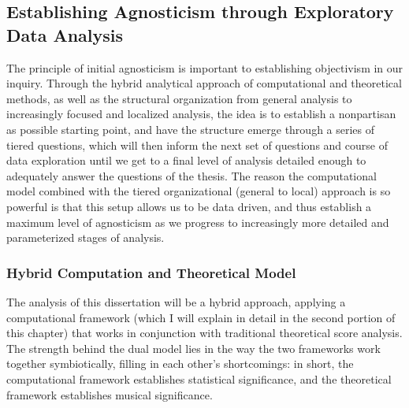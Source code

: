     \subsection{Establishing Agnosticism through Exploratory Data
Analysis}\label{establishing-agnosticism-through-exploratory-data-analysis}

The principle of initial agnosticism is important to establishing
objectivism in our inquiry. Through the hybrid analytical approach of
computational and theoretical methods, as well as the structural
organization from general analysis to increasingly focused and localized
analysis, the idea is to establish a nonpartisan as possible starting
point, and have the structure emerge through a series of tiered
questions, which will then inform the next set of questions and course
of data exploration until we get to a final level of analysis detailed
enough to adequately answer the questions of the thesis. The reason the
computational model combined with the tiered organizational (general to
local) approach is so powerful is that this setup allows us to be data
driven, and thus establish a maximum level of agnosticism as we progress
to increasingly more detailed and parameterized stages of analysis.

\subsubsection{Hybrid Computation and Theoretical
Model}\label{hybrid-computation-and-theoretical-model}

The analysis of this dissertation will be a hybrid approach, applying a
computational framework (which I will explain in detail in the second
portion of this chapter) that works in conjunction with traditional
theoretical score analysis. The strength behind the dual model lies in
the way the two frameworks work together symbiotically, filling in each
other's shortcomings: in short, the computational framework establishes
statistical significance, and the theoretical framework establishes
musical significance.

